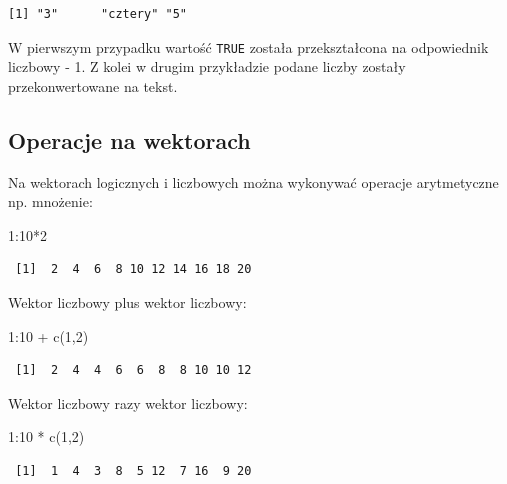 \documentclass[
  letterpaper,
  DIV=11,
  numbers=noendperiod]{scrreprt}
\newenvironment{Shaded}{\begin{snugshade}}{\end{snugshade}}
\newcommand{\DecValTok}[1]{\textcolor[rgb]{0.68,0.00,0.00}{#1}}
\newcommand{\FunctionTok}[1]{\textcolor[rgb]{0.28,0.35,0.67}{#1}}
\newcommand{\NormalTok}[1]{\textcolor[rgb]{0.00,0.23,0.31}{#1}}
\newcommand{\SpecialCharTok}[1]{\textcolor[rgb]{0.37,0.37,0.37}{#1}}
\begin{document}
\begin{verbatim}
[1] "3"      "cztery" "5"     
\end{verbatim}

W pierwszym przypadku wartość \texttt{TRUE} została przekształcona na
odpowiednik liczbowy - 1. Z kolei w drugim przykładzie podane liczby
zostały przekonwertowane na tekst.

\hypertarget{operacje-na-wektorach}{%
\subsection{Operacje na wektorach}\label{operacje-na-wektorach}}

Na wektorach logicznych i liczbowych można wykonywać operacje
arytmetyczne np. mnożenie:

\begin{Shaded}
\begin{Highlighting}[]
\DecValTok{1}\SpecialCharTok{:}\DecValTok{10}\SpecialCharTok{*}\DecValTok{2}
\end{Highlighting}
\end{Shaded}

\begin{verbatim}
 [1]  2  4  6  8 10 12 14 16 18 20
\end{verbatim}

Wektor liczbowy plus wektor liczbowy:

\begin{Shaded}
\begin{Highlighting}[]
\DecValTok{1}\SpecialCharTok{:}\DecValTok{10} \SpecialCharTok{+} \FunctionTok{c}\NormalTok{(}\DecValTok{1}\NormalTok{,}\DecValTok{2}\NormalTok{)}
\end{Highlighting}
\end{Shaded}

\begin{verbatim}
 [1]  2  4  4  6  6  8  8 10 10 12
\end{verbatim}

Wektor liczbowy razy wektor liczbowy:

\begin{Shaded}
\begin{Highlighting}[]
\DecValTok{1}\SpecialCharTok{:}\DecValTok{10} \SpecialCharTok{*} \FunctionTok{c}\NormalTok{(}\DecValTok{1}\NormalTok{,}\DecValTok{2}\NormalTok{)}
\end{Highlighting}
\end{Shaded}

\begin{verbatim}
 [1]  1  4  3  8  5 12  7 16  9 20
\end{verbatim}
\end{document}
